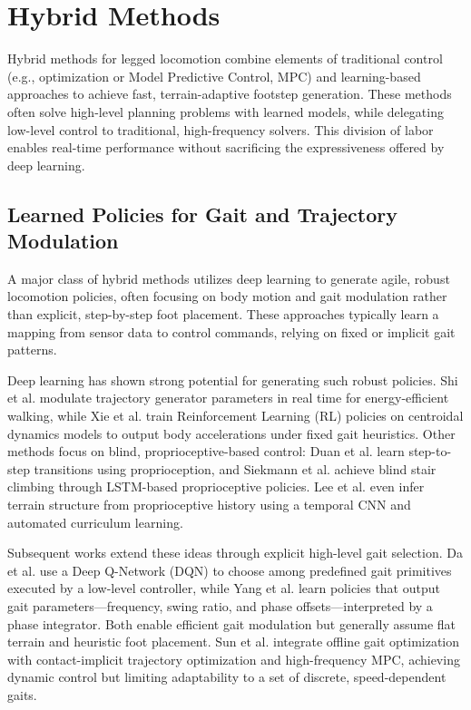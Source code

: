 \section{Hybrid Methods}
\label{sec:background-hybrid-methods}

Hybrid methods for legged locomotion combine elements of traditional
control (e.g., optimization or Model Predictive Control, MPC) and
learning-based approaches to achieve fast, terrain-adaptive footstep
generation. These methods often solve high-level planning problems
with learned models, while delegating low-level control to
traditional, high-frequency solvers. This division of labor enables
real-time performance without sacrificing the expressiveness offered
by deep learning.

\subsection{Learned Policies for Gait and Trajectory Modulation}
\label{sec:hybrid-gait-policies}

A major class of hybrid methods utilizes deep learning to generate
agile, robust locomotion policies, often focusing on body motion and
gait modulation rather than explicit, step-by-step foot placement.
These approaches typically learn a mapping from sensor data to
control commands, relying on fixed or implicit gait patterns.

Deep learning has shown strong potential for generating such robust
policies. Shi et al. \cite{shi_terrain-aware_2023} modulate
trajectory generator parameters in real time for energy-efficient
walking, while Xie et al. \cite{xie_glide_2023} train Reinforcement
Learning (RL) policies on centroidal dynamics models to output body
accelerations under fixed gait heuristics. Other methods focus on
blind, proprioceptive-based control: Duan et al.
\cite{duan_sim--real_2022} learn step-to-step transitions using
proprioception, and Siekmann et al. \cite{siekmann_blind_2021}
achieve blind stair climbing through LSTM-based proprioceptive
policies. Lee et al. \cite{lee_learning_2020} even infer terrain
structure from proprioceptive history using a temporal CNN and
automated curriculum learning.

Subsequent works extend these ideas through explicit high-level gait
selection. Da et al. \cite{da_learning_2020} use a Deep Q-Network
(DQN) to choose among predefined gait primitives executed by a
low-level controller, while Yang et al.
\cite{yang_fast_2021} learn policies that output gait
parameters---frequency, swing ratio, and phase offsets---interpreted
by a phase integrator. Both enable efficient gait modulation but
generally assume flat terrain and heuristic foot placement. Sun et
al. \cite{sun_online_2024} integrate offline gait optimization with
contact-implicit trajectory optimization and high-frequency MPC,
achieving dynamic control but limiting adaptability to a set of
discrete, speed-dependent gaits.

